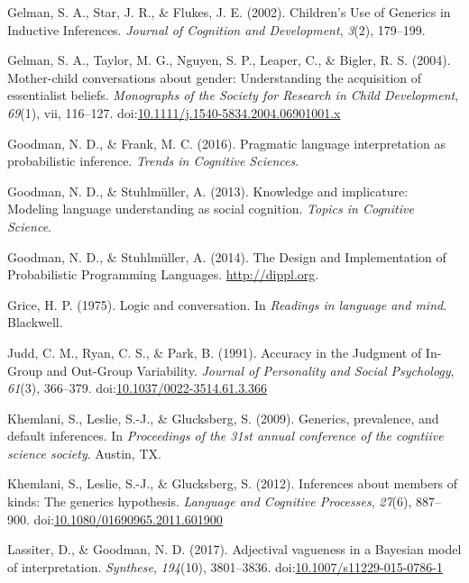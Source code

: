 \documentclass[floatsintext,doc]{apa6}
\begin{document}
\leavevmode\hypertarget{ref-Gelman2002}{}%
Gelman, S. A., Star, J. R., \& Flukes, J. E. (2002). Children's Use of Generics in Inductive Inferences. \emph{Journal of Cognition and Development}, \emph{3}(2), 179--199.

\leavevmode\hypertarget{ref-GelmanEtAl2004}{}%
Gelman, S. A., Taylor, M. G., Nguyen, S. P., Leaper, C., \& Bigler, R. S. (2004). Mother-child conversations about gender: Understanding the acquisition of essentialist beliefs. \emph{Monographs of the Society for Research in Child Development}, \emph{69}(1), vii, 116--127. doi:\href{https://doi.org/10.1111/j.1540-5834.2004.06901001.x}{10.1111/j.1540-5834.2004.06901001.x}

\leavevmode\hypertarget{ref-Goodman2016}{}%
Goodman, N. D., \& Frank, M. C. (2016). Pragmatic language interpretation as probabilistic inference. \emph{Trends in Cognitive Sciences}.

\leavevmode\hypertarget{ref-Goodman2013}{}%
Goodman, N. D., \& Stuhlmüller, A. (2013). Knowledge and implicature: Modeling language understanding as social cognition. \emph{Topics in Cognitive Science}.

\leavevmode\hypertarget{ref-dippl}{}%
Goodman, N. D., \& Stuhlmüller, A. (2014). The Design and Implementation of Probabilistic Programming Languages. \url{http://dippl.org}.

\leavevmode\hypertarget{ref-Grice1975}{}%
Grice, H. P. (1975). Logic and conversation. In \emph{Readings in language and mind}. Blackwell.

\leavevmode\hypertarget{ref-Judd1991}{}%
Judd, C. M., Ryan, C. S., \& Park, B. (1991). Accuracy in the Judgment of In-Group and Out-Group Variability. \emph{Journal of Personality and Social Psychology}, \emph{61}(3), 366–379. doi:\href{https://doi.org/10.1037/0022-3514.61.3.366}{10.1037/0022-3514.61.3.366}

\leavevmode\hypertarget{ref-Khemlani2009}{}%
Khemlani, S., Leslie, S.-J., \& Glucksberg, S. (2009). Generics, prevalence, and default inferences. In \emph{Proceedings of the 31st annual conference of the cogntiive science society}. Austin, TX.

\leavevmode\hypertarget{ref-Khemlani2012}{}%
Khemlani, S., Leslie, S.-J., \& Glucksberg, S. (2012). Inferences about members of kinds: The generics hypothesis. \emph{Language and Cognitive Processes}, \emph{27}(6), 887--900. doi:\href{https://doi.org/10.1080/01690965.2011.601900}{10.1080/01690965.2011.601900}

\leavevmode\hypertarget{ref-Lassiter2017}{}%
Lassiter, D., \& Goodman, N. D. (2017). Adjectival vagueness in a Bayesian model of interpretation. \emph{Synthese}, \emph{194}(10), 3801--3836. doi:\href{ https://doi.org/10.1007/s11229-015-0786-1}{10.1007/s11229-015-0786-1}
\end{document}
